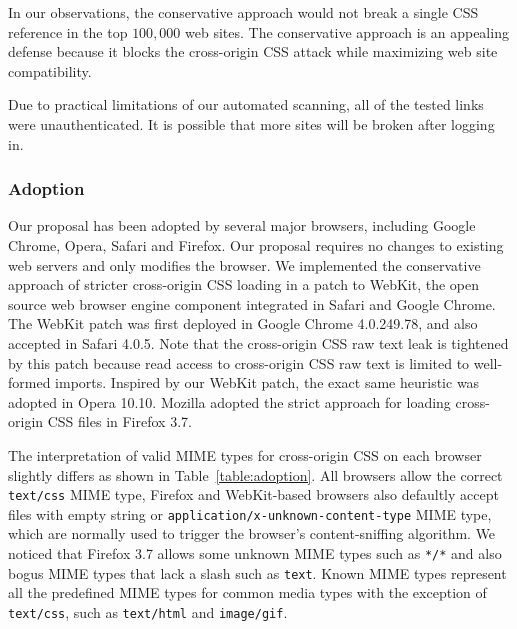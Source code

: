 \documentclass{acm_proc_article-sp}
\begin{document}
In our observations, the conservative approach would not break a single CSS reference in the top $100,000$ web sites. The conservative approach is an appealing defense because it blocks the cross-origin CSS attack while maximizing web site compatibility.

Due to practical limitations of our automated scanning, all of the tested links were unauthenticated. It is possible that more sites will be broken after logging in.

\subsubsection{Adoption}
Our proposal has been adopted by several major browsers, including Google Chrome, Opera, Safari and Firefox. Our proposal requires no changes to existing web servers and only modifies the browser. We implemented the conservative approach of stricter cross-origin CSS loading in a patch to WebKit, the open source web browser engine component integrated in Safari and Google Chrome. The WebKit patch was first deployed in Google Chrome 4.0.249.78, and also accepted in Safari 4.0.5. Note that the cross-origin CSS raw text leak is tightened by this patch because read access to cross-origin CSS raw text is limited to well-formed imports. Inspired by our WebKit patch, the exact same heuristic was adopted in Opera 10.10. Mozilla adopted the strict approach for loading cross-origin CSS files in Firefox 3.7.

The interpretation of valid MIME types for cross-origin CSS on each browser slightly differs as shown in Table~\ref{table:adoption}. All browsers allow the correct \texttt{text/css} MIME type, Firefox and WebKit-based browsers also defaultly accept files with empty string or \texttt{application/x-unknown-content-type} MIME type, which are normally used to trigger the browser's content-sniffing algorithm. We noticed that Firefox 3.7 allows some unknown MIME types such as \texttt{*/*} and also bogus MIME types that lack a slash such as \texttt{text}. Known MIME types represent all the predefined MIME types for common media types with the exception of \texttt{text/css}, such as \texttt{text/html} and \texttt{image/gif}.
\end{document}
